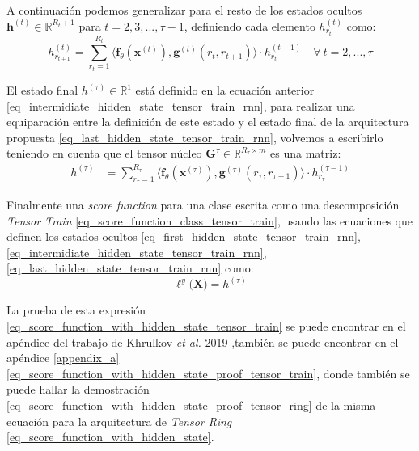 \documentclass[spanish]{article}
\theoremstyle{definition}
\theoremstyle{remark}
\numberwithin{equation}{section}
\numberwithin{equation}{section} %
\begin{document}
A continuación podemos generalizar para el resto de los estados ocultos $\boldsymbol{h}^{(t)} \in \mathbb{R}^{R_t+1}$ para $t=2,3,...,\tau-1$, definiendo cada elemento $h^{(t)}_{r_t}$ como:
\begin{equation}
\label{eq_intermidiate_hidden_state_tensor_train_rnn}
h^{(t)}_{r_{t+1}}   
= \sum^{R_{t}}_{r_{t}=1} \langle \boldsymbol{f}_\theta(\boldsymbol{x}^{(t)}),\boldsymbol{g}^{(t)}(r_t,r_{t+1}) \rangle \cdot h^{(t-1)}_{r_t}  \quad \forall \ t=2,...,\tau
\end{equation} \par
El estado final $h^{(\tau)} \in \mathbb{R}^{1}$ está definido en la ecuación anterior \eqref{eq_intermidiate_hidden_state_tensor_train_rnn}, para realizar una equiparación entre la definición de este estado y el estado final de la arquitectura propuesta \eqref{eq_last_hidden_state_tensor_train_rnn}, volvemos a escribirlo teniendo en cuenta que el tensor núcleo $\boldsymbol{G}^{\tau} \in \mathbb{R}^{R_\tau \times m}$ es una matriz:
\begin{equation}
\label{eq_last_hidden_state_tensor_train_rnn}
\begin{split}
h^{(\tau)} &
= \sum^{R_{\tau}}_{r_{\tau}=1} \langle \boldsymbol{f}_\theta(\boldsymbol{x}^{(\tau)}),\boldsymbol{g}^{(\tau)}(r_\tau,r_{\tau+1}) \rangle \cdot h^{(\tau-1)}_{r_\tau}
\end{split}
\end{equation} \par
\par
Finalmente una \textit{score function} para una clase escrita como una descomposición  \textit{Tensor Train} \eqref{eq_score_function_class_tensor_train}, usando las ecuaciones que definen los estados ocultos \eqref{eq_first_hidden_state_tensor_train_rnn}, \eqref{eq_intermidiate_hidden_state_tensor_train_rnn}, \eqref{eq_last_hidden_state_tensor_train_rnn} como:
\begin{equation}
\label{eq_score_function_with_hidden_state_tensor_train}
\ell^y\big(\boldsymbol{X}\big) = h^{(\tau)}
\end{equation} \par
La prueba de esta expresión \eqref{eq_score_function_with_hidden_state_tensor_train} se puede encontrar en el apéndice del trabajo de Khrulkov \textit{et al.} 2019 \cite{khrulkov2019generalized},también se puede encontrar en el apéndice \ref{appendix_a} \eqref{eq_score_function_with_hidden_state_proof_tensor_train}, donde también se puede hallar la demostración \eqref{eq_score_function_with_hidden_state_proof_tensor_ring} de la misma ecuación para la arquitectura de \textit{Tensor Ring} \eqref{eq_score_function_with_hidden_state}. 
\end{document}
